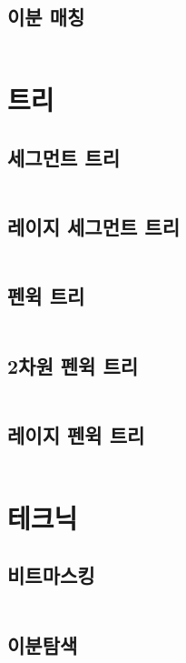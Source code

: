 \documentclass{article}
\begin{document}
\begin{multicols}{2}
\subsection{이분 매칭}
\inputminted[linenos, breaklines]{python}{codes/bimatch.py}

\section{트리}
\subsection{세그먼트 트리}
\inputminted[linenos, breaklines]{cpp}{codes/segtree.cpp}
\subsection{레이지 세그먼트 트리}
\inputminted[linenos, breaklines]{cpp}{codes/lazyseg.cpp}
\subsection{펜윅 트리}
\inputminted[linenos, breaklines]{python}{codes/fenwick.py}
\subsection{2차원 펜윅 트리}
\inputminted[linenos, breaklines]{python}{codes/fenwick2d.py}
\subsection{레이지 펜윅 트리}
\inputminted[linenos, breaklines]{cpp}{codes/lazyfenwick.cpp}

\section{테크닉}
\subsection{비트마스킹}
\inputminted[linenos, breaklines]{python}{codes/bit.py}
\subsection{이분탐색}
\inputminted[linenos, breaklines]{python}{codes/bisect.py}


\end{multicols}
%
\end{document}
